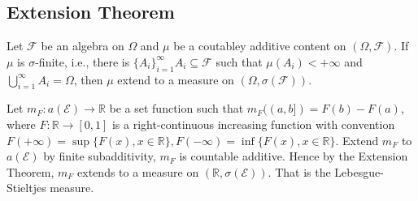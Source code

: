 \documentclass[11pt,singlecolumn, openany, citestyle=authoryear]{elegantbook}
\begin{document}
\begin{CJK}{UTF8}{gbsn}
\section{Extension Theorem}
\begin{theorem}
    Let $\mathcal{F}$ be an algebra on $\Omega$ and $\mu$ be a coutabley additive 
    content on $(\Omega,\mathcal{F})$. If $\mu$ is $\sigma$-finite, i.e., there is 
    $\{A_i\}_{i=1}^\infty A_i \subseteq \mathcal{F}$ such that $\mu(A_i)<+\infty$ and 
    $\displaystyle \bigcup_{i=1}^\infty A_i = \Omega$, then $\mu$ extend to a measure on 
    $(\Omega, \sigma(\mathcal{F}))$.
\end{theorem}

\begin{example}
    Let $m_F:a(\mathcal{E})\to \mathbb{R}$ be a set function such that $m_F((a,b])=F(b)-F(a)$,
    where $F:\mathbb{R}\to [0,1]$ is a right-continuous increasing function with convention 
    $F(+\infty)=\sup\{F(x),x\in \mathbb{R}\}, F(-\infty)=\inf\{F(x),x\in\mathbb{R}\}$.
    Extend $m_F$ to $a(\mathcal{E})$ by finite subadditivity, $m_F$ is countable additive.
    Hence by the Extension Theorem, $m_F$ extends to a measure on $(\mathbb{R},\sigma(\mathcal{E}))$.
    That is the Lebesgue-Stieltjes measure. 
\end{example}


\end{CJK}
\end{document}
